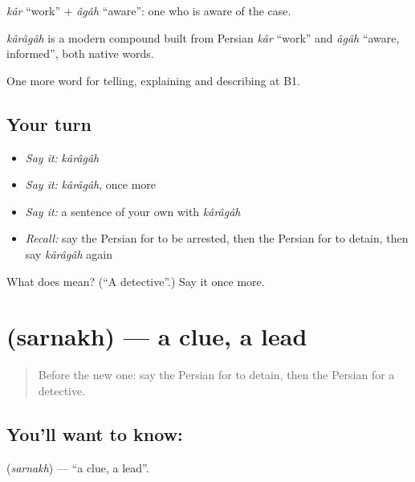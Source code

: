 \emph{kâr} \textquotedblleft{}work\textquotedblright{} + \emph{âgâh} \textquotedblleft{}aware\textquotedblright{}: one who is aware of the case.

\begin{cousinweb}
\emph{kârâgâh} is a modern compound built from Persian \emph{kâr} \textquotedblleft{}work\textquotedblright{} and \emph{âgâh} \textquotedblleft{}aware, informed\textquotedblright{}, both native words.
\end{cousinweb}

\begin{grammarlens}[title={What you've built}]
One more word for telling, explaining and describing at B1.
\end{grammarlens}

\subsection*{Your turn}
\begin{itemize}
\raggedright
  \item \emph{Say it:} \emph{kârâgâh}
  \item \emph{Say it:} \emph{kârâgâh}, once more
  \item \emph{Say it:} a sentence of your own with \emph{kârâgâh}
  \item \emph{Recall:} say the Persian for to be arrested, then the Persian for to detain, then say \emph{kârâgâh} again
\end{itemize}

\begin{tcolorbox}[breakable,colback=teal!4,colframe=teal!35!black,title={Before you move on}]
What does  mean? (\textquotedblleft{}A detective\textquotedblright{}.) Say it once more.
\end{tcolorbox}
\section[\texorpdfstring{\fa{سرنخ} (sarnakh)}{سرنخ (sarnakh)}]{ (sarnakh) — a clue, a lead}

\label{lesson:FA-C320-sarnakh}



\begin{quote}
Before the new one: say the Persian for to detain, then the Persian for a detective.
\end{quote}

\subsection*{You'll want to know: }
\textbf{} (\emph{sarnakh}) — \textquotedblleft{}a clue, a lead\textquotedblright{}.

